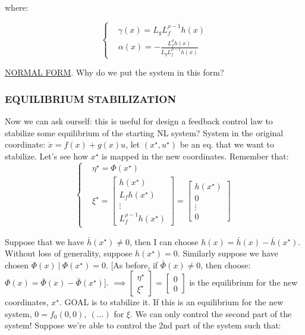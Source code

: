 where:

\[
	\left\{
	\begin{aligned}
	&\gamma(x) = L_gL^{\rho -1}_fh(x) \\
	&\alpha(x) = -\frac{L^\rho_fh(x)}{L_gL^{\rho-1}_fh(x)}
	\end{aligned}
	\right.
\]

\underline{NORMAL FORM}. Why do we put the system in this form? 

\subsubsection{EQUILIBRIUM STABILIZATION}

Now we can ask ourself: this is useful for design a feedback control law to stabilize some equilibrium of the starting NL system? System in the original coordinate:
$\dot{x}=f(x)+g(x)u$, let $(x^\star,u^\star)$ be an eq. that we want to stabilize. Let's see how $x^\star$ is mapped in the new coordinates. Remember that:
\[
	\left\{
	\begin{aligned}
	&\eta^\star = \Phi(x^\star) \\
	&\xi^\star = \begin{bmatrix}h(x^\star)\\L_fh(x^\star)\\ \vdots\\L_f^{\rho -1}h(x^\star)\end{bmatrix} = \begin{bmatrix}h(x^\star)\\0\\ \vdots\\0\end{bmatrix}
	\end{aligned}
	\right.
\]

Suppose that we have $\bar{h}({x}^\star) \neq 0$, then I can choose $h(x) = \bar{h}(x) - \bar{h}(x^\star)$. Without loss of generality, suppose $h(x^\star) = 0$. Similarly suppose we have chosen $\Phi(x)\ |\ \Phi(x^\star) = 0$. [As before, if $\bar{\Phi}(x) \neq 0$, then choose: $\Phi(x) = \bar{\Phi}(x) - \bar{\Phi}(x^\star)$]. $\implies \begin{bmatrix}\eta^\star \\ \xi^\star \end{bmatrix}=\begin{bmatrix}0\\0\end{bmatrix}$ is the equilibrium for the new coordinates, $x^\star$. GOAL is to stabilize it. If this is an equilibrium for the new system, $0 = f_0(0,0),\ (\dots)$ for $\xi$.
We can only control the second part of the system! Suppose we're able to control the 2nd part of the system such that:

